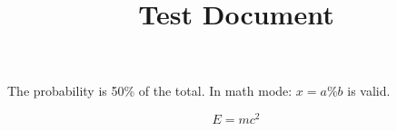 \documentclass{article}
\begin{document}
\title{Test Document}
\maketitle

The probability is 50\% of the total.
In math mode: $x = a \% b$ is valid.

\begin{equation}
  E = mc^2
\end{equation}
\end{document}
